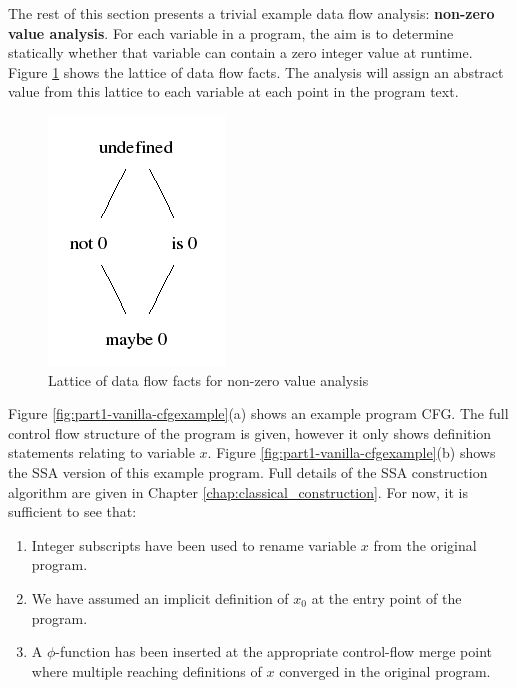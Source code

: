 
The rest of this section presents a trivial example
data flow analysis: 
\textbf{non-zero value analysis}. 
For each variable in a program, the aim is to determine statically whether
that variable can contain a zero integer value at runtime.
Figure \ref{fig:part1-vanilla-nonzerolattice} shows the lattice of 
data flow facts. The analysis will assign an abstract value from this lattice
to each variable at each point in the program text.

\begin{figure}
\begin{center}
\includegraphics[scale=0.6]{zero_lattice.png}
\end{center}
\caption{\label{fig:part1-vanilla-nonzerolattice}Lattice of data flow facts
  for non-zero value analysis}
\end{figure}

Figure \ref{fig:part1-vanilla-cfgexample}(a) shows an example program CFG.
The full control flow structure of the program is given, however
it only shows definition
statements relating to variable $x$.
Figure \ref{fig:part1-vanilla-cfgexample}(b) shows the SSA version of this
example program. Full details of the SSA construction algorithm are given in 
Chapter \ref{chap:classical_construction}. For now, it is sufficient to see that:
\begin{enumerate}
\item Integer subscripts have been used to rename
variable $x$ from the original program.
\item We have assumed an implicit definition of $x_0$ at the entry point of
  the program.
\item A $\phi$-function has been
inserted at the appropriate control-flow merge point where multiple reaching
definitions of $x$ converged in the original program.
\end{enumerate}


